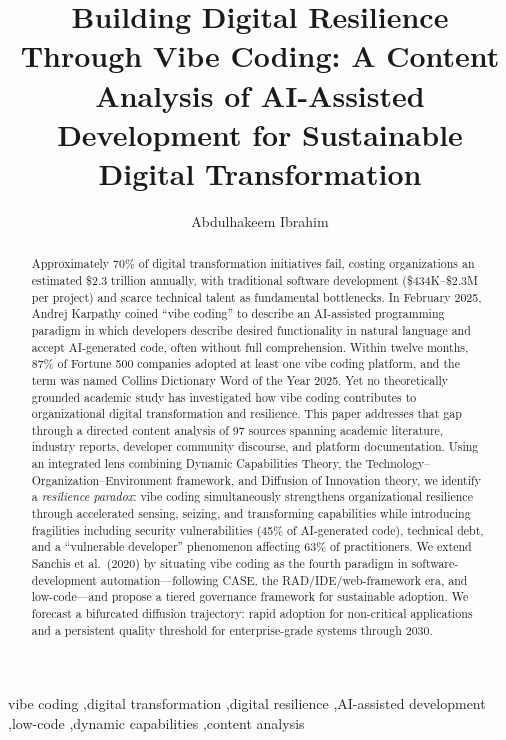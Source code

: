 \documentclass[preprint,12pt,authoryear]{elsarticle}
\begin{document}
\begin{frontmatter}

\title{Building Digital Resilience Through Vibe Coding: A Content Analysis of AI-Assisted Development for Sustainable Digital Transformation}

\author[inst1]{Abdulhakeem Ibrahim}



\begin{abstract}
Approximately 70\% of digital transformation initiatives fail, costing organizations an estimated \$2.3 trillion annually, with traditional software development (\$434K--\$2.3M per project) and scarce technical talent as fundamental bottlenecks. In February 2025, Andrej Karpathy coined ``vibe coding'' to describe an AI-assisted programming paradigm in which developers describe desired functionality in natural language and accept AI-generated code, often without full comprehension. Within twelve months, 87\% of Fortune 500 companies adopted at least one vibe coding platform, and the term was named Collins Dictionary Word of the Year 2025. Yet no theoretically grounded academic study has investigated how vibe coding contributes to organizational digital transformation and resilience. This paper addresses that gap through a directed content analysis of 97 sources spanning academic literature, industry reports, developer community discourse, and platform documentation. Using an integrated lens combining Dynamic Capabilities Theory, the Technology--Organization--Environment framework, and Diffusion of Innovation theory, we identify a \emph{resilience paradox}: vibe coding simultaneously strengthens organizational resilience through accelerated sensing, seizing, and transforming capabilities while introducing fragilities including security vulnerabilities (45\% of AI-generated code), technical debt, and a ``vulnerable developer'' phenomenon affecting 63\% of practitioners. We extend Sanchis et al.\ (2020) by situating vibe coding as the fourth paradigm in software-development automation---following CASE, the RAD/IDE/web-framework era, and low-code---and propose a tiered governance framework for sustainable adoption. We forecast a bifurcated diffusion trajectory: rapid adoption for non-critical applications and a persistent quality threshold for enterprise-grade systems through 2030.
\end{abstract}

\begin{keyword}
vibe coding \sep digital transformation \sep digital resilience \sep AI-assisted development \sep low-code \sep dynamic capabilities \sep content analysis
\end{keyword}

\end{frontmatter}
\end{document}
